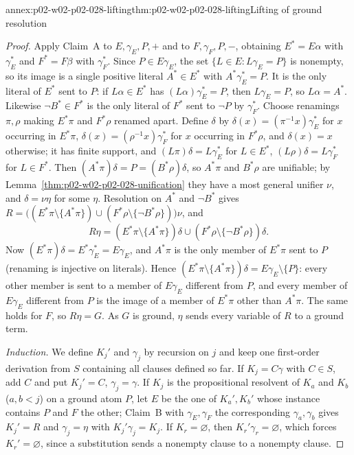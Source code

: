 \begin{annexitem}{annex:p02-w02-p02-028-lifting}{thm:p02-w02-p02-028-lifting}{Lifting of ground resolution}
\begin{proof}
Apply Claim~A to \(E,\gamma_E,P,+\) and to \(F,\gamma_F,P,-\), obtaining
\(E^*=E\alpha\) with \(\gamma_E^*\) and \(F^*=F\beta\) with
\(\gamma_F^*\).  Since \(P\in E\gamma_E\), the set \(\{L\in E:L\gamma_E=P\}\)
is nonempty, so its image is a single positive literal \(A^*\in E^*\) with
\(A^*\gamma_E^*=P\).  It is the only literal of \(E^*\) sent to \(P\): if
\(L\alpha\in E^*\) has \((L\alpha)\gamma_E^*=P\), then \(L\gamma_E=P\), so
\(L\alpha=A^*\).  Likewise \(\neg B^*\in F^*\) is the only literal of \(F^*\)
sent to \(\neg P\) by \(\gamma_F^*\).  Choose renamings \(\pi,\rho\) making
\(E^*\pi\) and \(F^*\rho\) renamed apart.  Define \(\delta\) by
\(\delta(x)=(\pi^{-1}x)\gamma_E^*\) for \(x\) occurring in \(E^*\pi\),
\(\delta(x)=(\rho^{-1}x)\gamma_F^*\) for \(x\) occurring in \(F^*\rho\), and
\(\delta(x)=x\) otherwise; it has finite support, and
\((L\pi)\delta=L\gamma_E^*\) for \(L\in E^*\),
\((L\rho)\delta=L\gamma_F^*\) for \(L\in F^*\).  Then
\((A^*\pi)\delta=P=(B^*\rho)\delta\), so \(A^*\pi\) and \(B^*\rho\) are
unifiable; by Lemma~\ref{thm:p02-w02-p02-028-unification} they have a most
general unifier \(\nu\), and \(\delta=\nu\eta\) for some \(\eta\).
Resolution on \(A^*\) and \(\neg B^*\) gives
\(R=\bigl((E^*\pi\setminus\{A^*\pi\})\cup(F^*\rho\setminus\{\neg B^*\rho\})\bigr)\nu\),
and
\[
 R\eta=(E^*\pi\setminus\{A^*\pi\})\delta\cup(F^*\rho\setminus\{\neg B^*\rho\})\delta .
\]
Now \((E^*\pi)\delta=E^*\gamma_E^*=E\gamma_E\), and \(A^*\pi\) is the only
member of \(E^*\pi\) sent to \(P\) (renaming is injective on literals).
Hence \((E^*\pi\setminus\{A^*\pi\})\delta=E\gamma_E\setminus\{P\}\): every
other member is sent to a member of \(E\gamma_E\) different from \(P\), and
every member of \(E\gamma_E\) different from \(P\) is the image of a member
of \(E^*\pi\) other than \(A^*\pi\).  The same holds for \(F\), so
\(R\eta=G\).  As \(G\) is ground, \(\eta\) sends every variable of \(R\) to a
ground term.

\emph{Induction.}  We define \(K_j'\) and \(\gamma_j\) by recursion on \(j\)
and keep one first-order derivation from \(S\) containing all clauses defined
so far.  If \(K_j=C\gamma\) with \(C\in S\), add \(C\) and put
\(K_j'=C\), \(\gamma_j=\gamma\).  If \(K_j\) is the propositional resolvent of
\(K_a\) and \(K_b\) (\(a,b<j\)) on a ground atom \(P\), let \(E\) be the one
of \(K_a',K_b'\) whose instance contains \(P\) and \(F\) the other; Claim~B
with \(\gamma_E,\gamma_F\) the corresponding \(\gamma_a,\gamma_b\) gives
\(K_j'=R\) and \(\gamma_j=\eta\) with \(K_j'\gamma_j=K_j\).  If
\(K_r=\varnothing\), then \(K_r'\gamma_r=\varnothing\), which forces
\(K_r'=\varnothing\), since a substitution sends a nonempty clause to a
nonempty clause.
\end{proof}
\end{annexitem}

